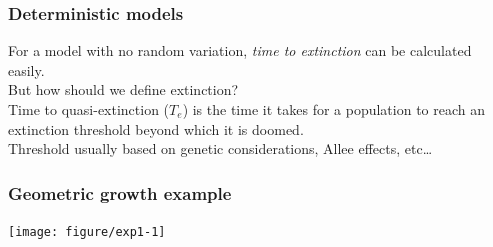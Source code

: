 \documentclass[color=usenames,dvipsnames]{beamer}\usepackage[]{graphicx}\usepackage[]{xcolor}
\begin{document}
\begin{frame}
  \frametitle{Deterministic models}
  \Large
  For a model with no random variation, \textit{time to extinction} can
      be calculated easily. \\
  \pause \vfill
  But how should we define extinction? \\
  \pause \vfill
  Time to quasi-extinction ($T_e$) is the time it takes for a
      population to reach an extinction threshold beyond which it is
      doomed. \\
  \pause \vfill
  Threshold usually based on genetic considerations, Allee
      effects, etc\dots
\end{frame}





\begin{frame}[fragile]
  \frametitle{Geometric growth example}

\texttt{[image: figure/exp1-1]}
\end{frame}



\end{document}
